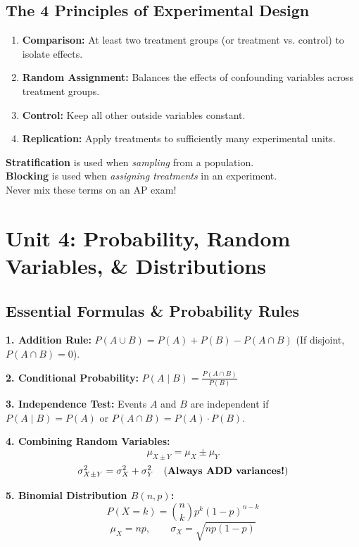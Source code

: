 \documentclass[11pt,oneside,openany]{book}
\begin{document}
\section{The 4 Principles of Experimental Design}
\begin{enumerate}[leftmargin=*]
    \item \textbf{Comparison:} At least two treatment groups (or treatment vs. control) to isolate effects.
    \item \textbf{Random Assignment:} Balances the effects of confounding variables across treatment groups.
    \item \textbf{Control:} Keep all other outside variables constant.
    \item \textbf{Replication:} Apply treatments to sufficiently many experimental units.
\end{enumerate}

\begin{trapbox}
\textbf{Stratification} is used when \emph{sampling} from a population.\\
\textbf{Blocking} is used when \emph{assigning treatments} in an experiment.\\
Never mix these terms on an AP exam!
\end{trapbox}

\chapter{Unit 4: Probability, Random Variables, \& Distributions}

\section{Essential Formulas \& Probability Rules}
\begin{formulabox}
\textbf{1. Addition Rule:} $P(A \cup B) = P(A) + P(B) - P(A \cap B)$ (If disjoint, $P(A \cap B) = 0$).

\textbf{2. Conditional Probability:} $P(A \mid B) = \frac{P(A \cap B)}{P(B)}$

\textbf{3. Independence Test:} Events $A$ and $B$ are independent if $P(A \mid B) = P(A)$ or $P(A \cap B) = P(A) \cdot P(B)$.

\textbf{4. Combining Random Variables:}
$$\mu_{X \pm Y} = \mu_X \pm \mu_Y$$
$$\sigma_{X \pm Y}^2 = \sigma_X^2 + \sigma_Y^2 \quad \text{(\textbf{Always ADD variances!})}$$

\textbf{5. Binomial Distribution $B(n, p)$:}
$$P(X = k) = \binom{n}{k} p^k (1-p)^{n-k}$$
$$\mu_X = np, \qquad \sigma_X = \sqrt{np(1-p)}$$
\end{formulabox}
\end{document}
